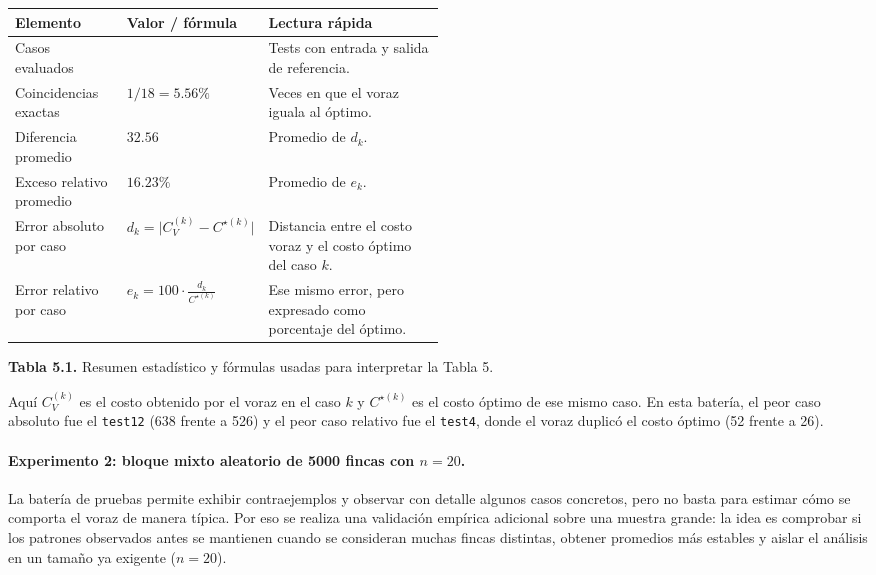 \documentclass[12pt,a4paper]{article}
\begin{document}
\begin{center}
  \footnotesize
  \begin{minipage}{0.96\textwidth}
    \centering
    \setlength{\tabcolsep}{3pt}
    \renewcommand{\arraystretch}{1.08}
    \begin{tabularx}{\linewidth}{@{}>{\raggedright\arraybackslash}p{0.26\linewidth}>{\centering\arraybackslash}p{0.24\linewidth}>{\raggedright\arraybackslash}X@{}}
      \toprule
      Elemento & Valor / f\'ormula & Lectura r\'apida \\
      \midrule
      Casos evaluados & 18 & Tests con entrada y salida de referencia. \\
      Coincidencias exactas & \(1/18 = 5.56\%\) & Veces en que el voraz iguala al \'optimo. \\
      Diferencia promedio & \(32.56\) & Promedio de \(d_k\). \\
      Exceso relativo promedio & \(16.23\%\) & Promedio de \(e_k\). \\
      Error absoluto por caso & \(d_k=\lvert C_V^{(k)}-C^{\star(k)}\rvert\) & Distancia entre el costo voraz y el costo \'optimo del caso \(k\). \\
      Error relativo por caso & \(e_k=100\cdot \frac{d_k}{C^{\star(k)}}\) & Ese mismo error, pero expresado como porcentaje del \'optimo. \\
      \bottomrule
    \end{tabularx}

    \vspace{0.35em}
    \textbf{Tabla 5.1.} Resumen estad\'istico y f\'ormulas usadas para interpretar la Tabla 5.
  \end{minipage}
\end{center}

Aqu\'i \(C_V^{(k)}\) es el costo obtenido por el voraz en el caso \(k\) y \(C^{\star(k)}\) es el costo \'optimo de ese mismo caso. En esta bater\'ia, el peor caso absoluto fue el \texttt{test12} (638 frente a 526) y el peor caso relativo fue el \texttt{test4}, donde el voraz duplic\'o el costo \'optimo (52 frente a 26).

\paragraph{Experimento 2: bloque mixto aleatorio de 5000 fincas con \(n=20\).}
La bater\'ia de pruebas permite exhibir contraejemplos y observar con detalle algunos casos concretos, pero no basta para estimar c\'omo se comporta el voraz de manera t\'ipica. Por eso se realiza una validaci\'on emp\'irica adicional sobre una muestra grande: la idea es comprobar si los patrones observados antes se mantienen cuando se consideran muchas fincas distintas, obtener promedios m\'as estables y aislar el an\'alisis en un tama\~no ya exigente (\(n=20\)).
\end{document}
